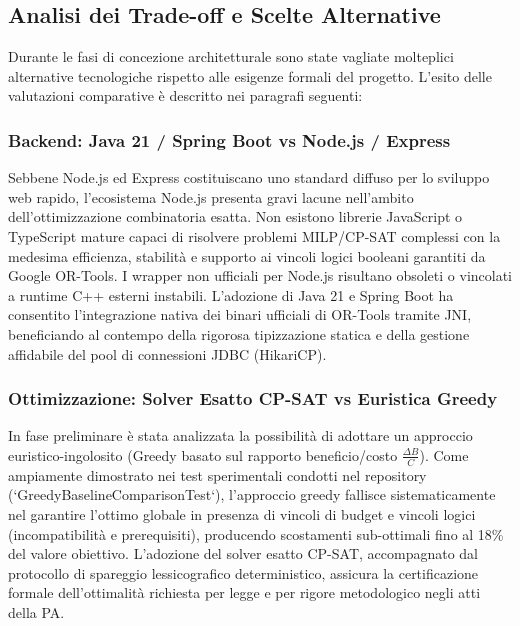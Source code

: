 \subsection{Analisi dei Trade-off e Scelte Alternative}
Durante le fasi di concezione architetturale sono state vagliate molteplici alternative tecnologiche rispetto alle esigenze formali del progetto. L'esito delle valutazioni comparative è descritto nei paragrafi seguenti:

\subsubsection{Backend: Java 21 / Spring Boot vs Node.js / Express}
Sebbene Node.js ed Express costituiscano uno standard diffuso per lo sviluppo web rapido, l'ecosistema Node.js presenta gravi lacune nell'ambito dell'ottimizzazione combinatoria esatta. Non esistono librerie JavaScript o TypeScript mature capaci di risolvere problemi MILP/CP-SAT complessi con la medesima efficienza, stabilità e supporto ai vincoli logici booleani garantiti da Google OR-Tools. I wrapper non ufficiali per Node.js risultano obsoleti o vincolati a runtime C++ esterni instabili. L'adozione di Java 21 e Spring Boot ha consentito l'integrazione nativa dei binari ufficiali di OR-Tools tramite JNI, beneficiando al contempo della rigorosa tipizzazione statica e della gestione affidabile del pool di connessioni JDBC (HikariCP).

\subsubsection{Ottimizzazione: Solver Esatto CP-SAT vs Euristica Greedy}
In fase preliminare è stata analizzata la possibilità di adottare un approccio euristico-ingolosito (Greedy basato sul rapporto beneficio/costo $\frac{\Delta B}{C}$). Come ampiamente dimostrato nei test sperimentali condotti nel repository (`GreedyBaselineComparisonTest`), l'approccio greedy fallisce sistematicamente nel garantire l'ottimo globale in presenza di vincoli di budget e vincoli logici (incompatibilità e prerequisiti), producendo scostamenti sub-ottimali fino al 18\% del valore obiettivo. L'adozione del solver esatto CP-SAT, accompagnato dal protocollo di spareggio lessicografico deterministico, assicura la certificazione formale dell'ottimalità richiesta per legge e per rigore metodologico negli atti della PA.


